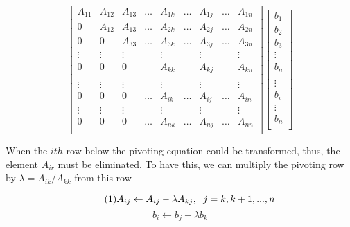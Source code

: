 \documentclass[a4paper]{article}
\numberwithin{equation}{subsection}
\begin{document}
\vspace{5mm} %
\begin{equation} \tag{M1}
\begin{bmatrix}
A_{11} & A_{12} & A_{13} & \dots & A_{1k} & \dots & A_{1j} & \dots & A_{1n} \\
0 & A_{12} & A_{13} & \dots & A_{2k} & \dots & A_{2j} & \dots & A_{2n}  \\
0 & 0 & A_{33} & \dots & A_{3k} & \dots & A_{3j} & \dots & A_{3n} \\
\vdots & \vdots & \vdots &  & \vdots & & \vdots & & \vdots  \\
0 & 0 & 0 & & A_{kk} & & A_{kj} & & A_{kn} \\
\\ \hline
\vdots & \vdots & \vdots &  & \vdots &  & \vdots &  & \vdots  \\
0 & 0 & 0 & \dots  & A_{ik} &  \dots & A_{ij} & \dots & A_{in}  \\
\vdots & \vdots & \vdots &  &\vdots &   &  \vdots & & \vdots  \\
0 & 0 & 0 & \dots  & A_{nk} & \dots  & A_{nj} &  \dots & A_{nn}  \\
\end{bmatrix}
\begin{bmatrix}
b_1 \\
b_2 \\
b_3 \\
\vdots \\
b_n \\
\\ \hline
\vdots \\
b_i \\
\vdots \\
b_n \\
\end{bmatrix}
\end{equation}



\vspace{5mm} %
When the $ith$ row below the pivoting equation could be transformed, thus, the element $A_{ir}$  must be eliminated. To have this, we can multiply the pivoting row by $\lambda = A_{ik} / A_{kk}$ from this row


\vspace{5mm} %
\begin{equation} \tag{1} \label{eq:1}
A_{ij} \leftarrow A_{ij} - \lambda A_{kj}, \hspace{2mm} j=k,k+1,...,n
\end{equation}
\begin{equation} \tag{1.1}
b_i \leftarrow b_j-\lambda b_k 
\end{equation}
\end{document}
